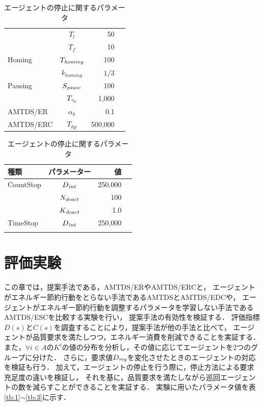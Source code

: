\documentclass[12pt,a4j,twoside]{jarticle}
\def\AgentSet{A}
\def\Dreq{{D_{\it req}}}
\def\HomingCheck{{T_{\it homing}}}
\def\PausingInt{{S_{\it pause}}}
\def\PauseTimeFactor{{\gamma_{\it p}}}
\def\DeactCheckInterval{D_{\it int}}
\def\DeactCount{N_{\it deact}}
\def\DeactThreshold{K_{\it deact}}
\begin{document}
\begin{table}
\begin{minipage}[t]{.55\textwidth}
\begin{tabular}{lcrr}
                      & $T_l$ & 50 \\
                      & $T_f$ & 10 \\ \hline
        Homing & $\HomingCheck$ & 100 \\
               & $k_{homing}$ & $1/3$ \\ \hline
        Pausing & $\PausingInt$ & 100 \\
                & $T_\PauseTimeFactor$ & 1,000 \\ \hline  
        AMTDS/ER & $\alpha_k$ & 0.1 \\ \hline
        AMTDS/ERC & $T_{hp}$ & 500,000 \\ \hline       
      \end{tabular}
      \label{tb:3}
    \end{minipage}

    \hfill

    \begin{minipage}[t]{.55\textwidth}
      \centering
      \caption{エージェントの停止に関するパラメータ}
      \begin{tabular}{lcrr} \\ \hline
        種類 & パラメーター & 値 \\ \hline
        CountStop & $\DeactCheckInterval$ & 250,000 \\
                  & $\DeactCount$ & 100 \\
                  & $\DeactThreshold$ & 1.0 \\ \hline
        TimeStop & $\DeactCheckInterval$ & 250,000\\
                  & 
        \end{tabular}
      \label{tb:4}
    \end{minipage}
  \end{table}

  
  \section{評価実験}
  この章では，提案手法である，AMTDS/ERやAMTDS/ERCと，
  エージェントがエネルギー節約行動をとらない手法であるAMTDS\cite{Yoneda2013}とAMTDS/EDC\cite{Sugiyama2019}や，
  エージェントがエネルギー節約行動を調整するパラメータを学習しない手法であるAMTDS/ESC\cite{Wu2019}を比較する実験を行い，
  提案手法の有効性を検証する．
  評価指標$D(s)$と$C(s)$を調査することにより，提案手法が他の手法と比べて，
  エージェントが品質要求を満たしつつ，エネルギー消費を削減できることを実証する．
  また，$\forall i\in\AgentSet$の$K^i$の値の分布を分析し，その値に応じてエージェントを2つのグループに分けた．
  さらに，要求値$\Dreq$を変化させたときのエージェントの対応を検証も行う．
  加えて，エージェントの停止を行う際に，停止方法による要求充足度の違いを検証し，
  それを基に，品質要求を満たしながら巡回エージェントの数を減らすことができることを実証する．
  実験に用いたパラメータ値を表\ref{tb:1}$\sim$\ref{tb:3}に示す．
\end{document}
